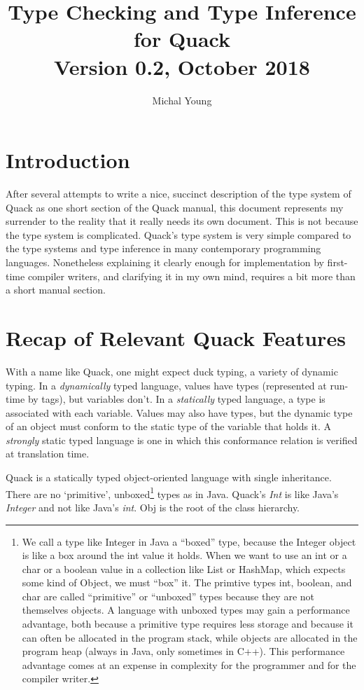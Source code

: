 \documentclass[11pt]{article}
\begin{document}
\title{Type Checking and Type Inference for Quack\\
\small   Version 0.2, October 2018}

\author{Michal Young}
\date{ }
\maketitle


\section{Introduction}

After several attempts to write a nice, succinct description of the
type system of Quack as one short section of the Quack manual, 
this document represents my surrender to the reality that it 
really needs its own document.  This is not because the type system is
complicated.  Quack's type system  is very simple compared to the type systems
and type inference in many contemporary programming languages.
Nonetheless explaining it clearly enough for implementation by 
first-time compiler writers, and clarifying it in my own mind, 
requires a bit more than a short manual section. 

\section{Recap of Relevant Quack Features}

With a name like Quack, one might expect duck typing, a variety of
dynamic typing.  In a \emph{dynamically} typed language, values have
types (represented at run-time by tags), but variables don't.  In a
\emph{statically} typed language, a type is associated with each
variable.  Values may also have types, but the dynamic type of an
object must conform to the static type of the variable that holds it.
A \emph{strongly} static typed language is one in which this
conformance relation is verified at translation time.

Quack is a statically typed object-oriented language with single
inheritance. There are no `primitive', unboxed\footnote{We call a type
  like Integer in Java a ``boxed'' type, because the Integer object is
  like a box around the int value it holds.  When we want to use an
  int or a char or a boolean value in a collection like List or
  HashMap, which expects some kind of Object, we must ``box'' it. The
  primtive types int, boolean, and char are called ``primitive'' or
  ``unboxed'' types because they are not themselves objects.  
  A language with unboxed types may gain a performance advantage, 
  both because a primitive type requires less storage and because it
  can often be allocated in the program stack, while objects are
  allocated in the program heap (always in Java, only sometimes in
  C++).  This performance
  advantage comes at an expense in complexity for the programmer and
  for the compiler writer.}
 types as in Java.
Quack's \emph{Int} is like Java's \emph{Integer} and not like Java's
\emph{int}. Obj is the root of the class hierarchy.
\end{document}
